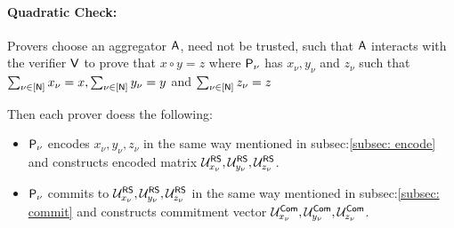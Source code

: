 \paragraph{Quadratic Check: }
Provers choose an aggregator $\mathsf{A}$, need not be trusted, such that $\mathsf{A}$ interacts with the verifier $\mathsf{V}$ to prove that $x \circ y = z$ where $\mathsf{P}_{\nu}$ has $x_{\nu}, y_{\nu}$ and $z_{\nu}$ such that $\sum_{\nu \in [\mathsf{N}]}x_{\nu} = x, \sum_{\nu \in [\mathsf{N}]}y_{\nu} = y$ and $\sum_{\nu \in [\mathsf{N}]}z_{\nu} = z$

Then each prover doess the following:
\begin{itemize}
	\item $\mathsf{P}_{\nu}$ encodes $x_{\nu}, y_{\nu}, z_{\nu}$ in the same way mentioned in subsec:\ref{subsec: encode} and constructs encoded matrix $\mathcal{U}^{\mathsf{RS}}_{x_{\nu}}, \mathcal{U}^{\mathsf{RS}}_{y_{\nu}}, \mathcal{U}^{\mathsf{RS}}_{z_{\nu}}$.
	\item $\mathsf{P}_{\nu}$ commits to $\mathcal{U}^{\mathsf{RS}}_{x_{\nu}}, \mathcal{U}^{\mathsf{RS}}_{y_{\nu}}, \mathcal{U}^{\mathsf{RS}}_{z_{\nu}}$ in the same way mentioned in subsec:\ref{subsec: commit} and constructs commitment vector $\mathcal{U}^{\mathsf{Com}}_{x_{\nu}}, \mathcal{U}^{\mathsf{Com}}_{y_{\nu}}, \mathcal{U}^{\mathsf{Com}}_{z_{\nu}}$.
\end{itemize}

